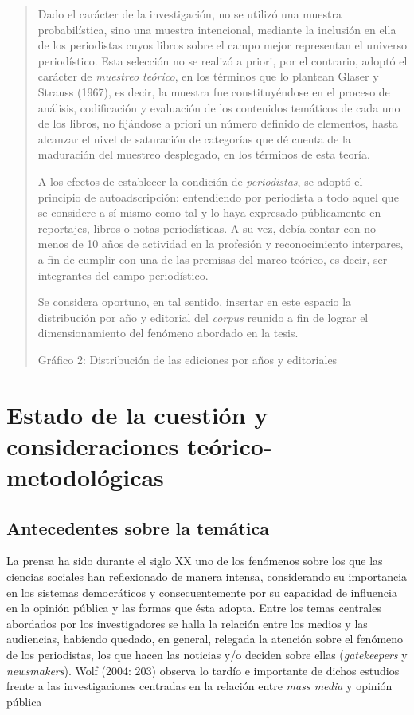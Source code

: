 \begin{quote}
Dado el carácter de la investigación, no se utilizó una muestra probabilística, sino una muestra intencional, mediante la inclusión en ella de los periodistas cuyos libros sobre el campo mejor representan el universo periodístico. Esta selección no se realizó a priori, por el contrario, adoptó el carácter de \emph{muestreo teórico}, en los términos que lo plantean Glaser y Strauss (1967), es decir, la muestra fue constituyéndose en el proceso de análisis, codificación y evaluación de los contenidos temáticos de cada uno de los libros, no fijándose a priori un número definido de elementos, hasta alcanzar el nivel de saturación de categorías que dé cuenta de la maduración del muestreo desplegado, en los términos de esta teoría.

A los efectos de establecer la condición de \emph{periodistas}, se adoptó el principio de autoadscripción: entendiendo por periodista a todo aquel que se considere a sí mismo como tal y lo haya expresado públicamente en reportajes, libros o notas periodísticas. A su vez, debía contar con no menos de 10 años de actividad en la profesión y reconocimiento interpares, a fin de cumplir con una de las premisas del marco teórico, es decir, ser integrantes del campo periodístico.

Se considera oportuno, en tal sentido, insertar en este espacio la distribución por año y editorial del \emph{corpus} reunido a fin de lograr el dimensionamiento del fenómeno abordado en la tesis.

Gráfico 2: Distribución de las ediciones por años y editoriales
\end{quote}

\chapter{Estado de la cuestión y consideraciones teórico-metodológicas}

\section{Antecedentes sobre la temática}

La prensa ha sido durante el siglo XX uno de los fenómenos sobre los que las ciencias sociales han reflexionado de manera intensa, considerando su importancia en los sistemas democráticos y consecuentemente por su capacidad de influencia en la opinión pública y las formas que ésta adopta. Entre los temas centrales abordados por los investigadores se halla la relación entre los medios y las audiencias, habiendo quedado, en general, relegada la atención sobre el fenómeno de los periodistas, los que hacen las noticias y/o deciden sobre ellas (\emph{gatekeepers} y \emph{newsmakers}). Wolf (2004: 203) observa lo tardío e importante de dichos estudios frente a las investigaciones centradas en la relación entre \emph{mass media} y opinión pública

